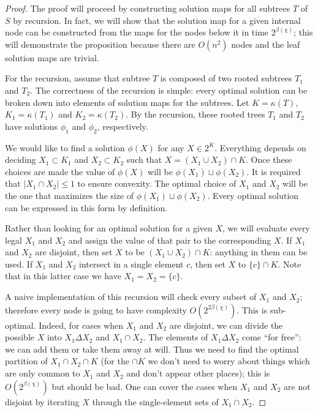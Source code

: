 \documentclass{amsart}
\newcommand{\col}{\chi}
\newcommand{\symmdiff}{\Delta}
\newcommand{\cut}{\kappa}
\newcommand{\bad}{\beta}
\begin{document}
\begin{proof}

The proof will proceed by constructing solution maps for all subtrees $T$ of $S$ by recursion.
In fact, we will show that the solution map for a given internal node can be constructed from the maps for the nodes below it in time $2^{\bad(\col)}$;
this will demonstrate the proposition because there are $O(n^2)$ nodes and the leaf solution maps are trivial.

For the recursion, assume that subtree $T$ is composed of two rooted subtrees $T_1$ and $T_2$.
The correctness of the recursion is simple: every optimal solution can be broken down into elements of solution maps for the subtrees.
Let $K = \cut(T)$, $K_1 = \cut(T_1)$ and $K_2 = \cut(T_2)$.
By the recursion, these rooted trees $T_1$ and $T_2$ have solutions $\phi_1$ and $\phi_2$, respectively.

We would like to find a solution $\phi(X)$ for any $X \in 2^K$.
Everything depends on deciding $X_1 \subset K_1$ and $X_2 \subset K_2$ such that $X = (X_1 \cup X_2) \cap K$.
Once these choices are made the value of $\phi(X)$ will be $\phi(X_1) \sqcup \phi(X_2)$.
It is required that $|X_1 \cap X_2| \leq 1$ to ensure convexity.
The optimal choice of $X_1$ and $X_2$ will be the one that maximizes the size of $\phi(X_1) \sqcup \phi(X_2)$.
Every optimal solution can be expressed in this form by definition.

Rather than looking for an optimal solution for a given $X$, we will evaluate every legal $X_1$ and $X_2$ and assign the value of that pair to the corresponding $X$.
If $X_1$ and $X_2$ are disjoint, then set $X$ to be $(X_1 \cup X_2) \cap K$: anything in them can be used.
If $X_1$ and $X_2$ intersect in a single element $c$, then set $X$ to $\{c\} \cap K$.
Note that in this latter case we have $X_1 = X_2 = \{c\}$.

A naive implementation of this recursion will check every subset of $X_1$ and $X_2$; therefore every node is going to have complexity $O(2^{2 \bad(\col)})$.
This is sub-optimal.
Indeed, for cases when $X_1$ and $X_2$ are disjoint, we can divide the possible $X$ into $X_1 \symmdiff X_2$ and $X_1 \cap X_2$.
The elements of $X_1 \symmdiff X_2$ come ``for free'': we can add them or take them away at will.
Thus we need to find the optimal partition of $X_1 \cap X_2 \cap K$ (for the $\cap K$ we don't need to worry about things which are only common to $X_1$ and $X_2$ and don't appear other places); this is $O(2^{\bad(\col)})$ but should be bad.
One can cover the cases when $X_1$ and $X_2$ are not disjoint by iterating $X$ through the single-element sets of $X_1 \cap X_2$.

\end{proof}
\end{document}
